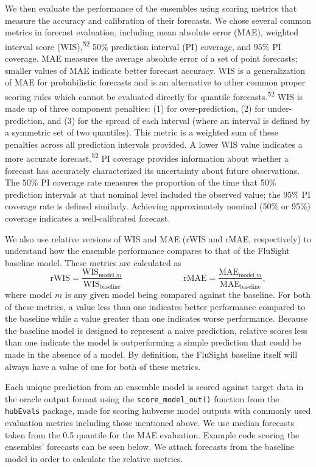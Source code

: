 \documentclass[
]{article}
\begin{document}
We then evaluate the performance of the ensembles using scoring metrics
that measure the accuracy and calibration of their forecasts. We chose
several common metrics in forecast evaluation, including mean absolute
error (MAE), weighted interval score (WIS),\textsuperscript{52} 50\%
prediction interval (PI) coverage, and 95\% PI coverage. MAE measures
the average absolute error of a set of point forecasts; smaller values
of MAE indicate better forecast accuracy. WIS is a generalization of MAE
for probabilistic forecasts and is an alternative to other common proper
scoring rules which cannot be evaluated directly for quantile
forecasts.\textsuperscript{52} WIS is made up of three component
penalties: (1) for over-prediction, (2) for under-prediction, and (3)
for the spread of each interval (where an interval is defined by a
symmetric set of two quantiles). This metric is a weighted sum of these
penalties across all prediction intervals provided. A lower WIS value
indicates a more accurate forecast.\textsuperscript{52} PI coverage
provides information about whether a forecast has accurately
characterized its uncertainty about future observations. The \(50\)\% PI
coverage rate measures the proportion of the time that 50\% prediction
intervals at that nominal level included the observed value; the 95\% PI
coverage rate is defined similarly. Achieving approximately nominal
(50\% or 95\%) coverage indicates a well-calibrated forecast.

We also use relative versions of WIS and MAE (rWIS and rMAE,
respectively) to understand how the ensemble performance compares to
that of the FluSight baseline model. These metrics are calculated as
\[\textrm{rWIS} = \frac{\textrm{WIS}_{\textrm{model }m}}{\textrm{WIS}_{\textrm{baseline}}} \hspace{3cm} \textrm{rMAE} = \frac{\textrm{MAE}_{\textrm{model }m}}{\textrm{MAE}_{\textrm{baseline}}},\]where
model \(m\) is any given model being compared against the baseline. For
both of these metrics, a value less than one indicates better
performance compared to the baseline while a value greater than one
indicates worse performance. Because the baseline model is designed to
represent a naive prediction, relative scores less than one indicate the
model is outperforming a simple prediction that could be made in the
absence of a model. By definition, the FluSight baseline itself will
always have a value of one for both of these metrics.

Each unique prediction from an ensemble model is scored against target
data in the oracle output format using the \texttt{score\_model\_out()}
function from the \texttt{hubEvals} package, made for scoring hubverse
model outputs with commonly used evaluation metrics including those
mentioned above. We use median forecasts taken from the 0.5 quantile for
the MAE evaluation. Example code scoring the ensembles' forecasts can be
seen below. We attach forecasts from the baseline model in order to
calculate the relative metrics.
\end{document}
